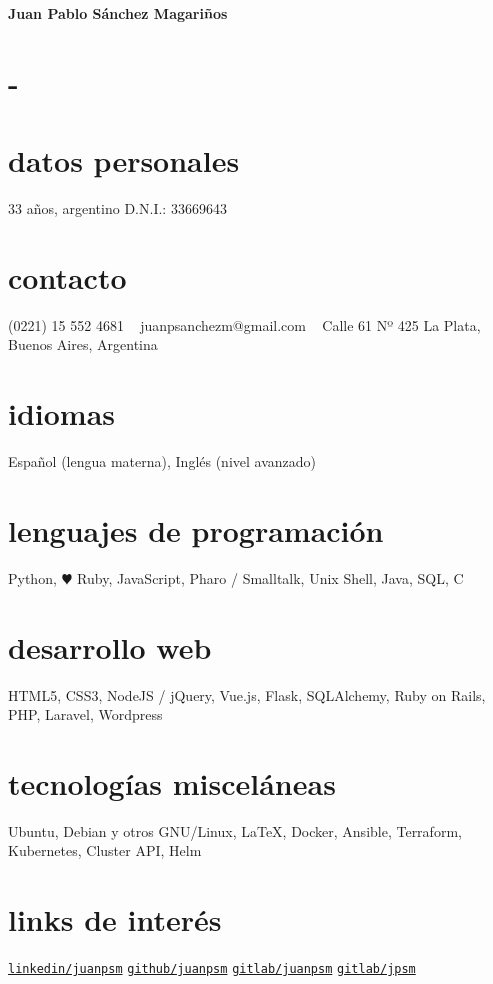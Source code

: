 \documentclass[espanol, print]{cv-style}     %
\begin{document}

\begin{aside}
{\Huge \textbf{Juan Pablo Sánchez Magariños}}
\section{-}
%
\section{datos personales}
33 años, argentino
D.N.I.: 33669643
%
\section{contacto}
(0221) 15 552 4681
~
juanpsanchezm@gmail.com
~
Calle 61 Nº 425
La Plata, Buenos Aires, Argentina
%
\section{idiomas}
Español (lengua materna),
Inglés (nivel avanzado)
%
\section{lenguajes de programación}
Python, {\color{red} $\varheartsuit$} Ruby, JavaScript, Pharo / Smalltalk, {Unix Shell}, Java, SQL, C
%
\section{desarrollo web}
HTML5, CSS3, NodeJS / jQuery, Vue.js, Flask, SQLAlchemy, Ruby on Rails, PHP, Laravel, Wordpress   
%
\section{tecnologías misceláneas}
Ubuntu, Debian y otros GNU/Linux, \LaTeX, Docker, Ansible, Terraform, Kubernetes, Cluster API, Helm
%
\section{links de interés}
\href{https://www.linkedin.com/in/juanpsm/}{\texttt{linkedin/juanpsm}}
\href{https://github.com/juanpsm}{\texttt{github/juanpsm}}
\href{https://gitlab.com/juanpsm}{\texttt{gitlab/juanpsm}}
\href{https://gitlab.catedras.linti.unlp.edu.ar/jpsm}{\texttt{gitlab/jpsm}}
\end{aside}
\vspace{-0.1cm}
\end{document}
